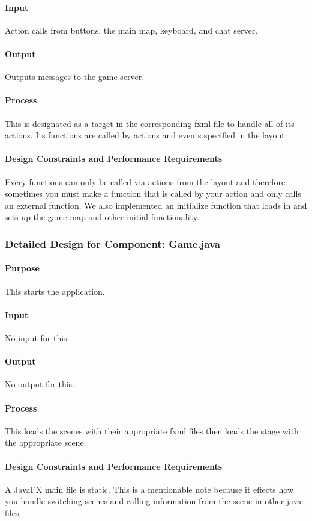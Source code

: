 \documentclass[12pt,a4paper,titlepage]{article}
\begin{document}
\paragraph{Input} Action calls from buttons, the main map, keyboard, and chat server.
\paragraph{Output} Outputs messages to the game server.
\paragraph{Process} This is designated as a target in the corresponding fxml file to handle all of its actions.  Its functions are called by actions and events specified in the layout.
\paragraph{Design Constraints and Performance Requirements}	Every functions can only be called via actions from the layout and therefore sometimes you must make a function that  is called by your action and only calls an external function.  We also implemented an initialize function that loads in and sets up the game map and other initial functionality.

\subsubsection{Detailed Design for Component: Game.java}
\paragraph{Purpose} This starts the application.
\paragraph{Input} No input for this.
\paragraph{Output} No output for this.
\paragraph{Process} This loads the scenes with their appropriate fxml files then loads the stage with the appropriate scene.
\paragraph{Design Constraints and Performance Requirements}	A JavaFX main file is static.  This is a mentionable note because it effects how you handle switching scenes and calling information from the scene in other java files.
\end{document}
